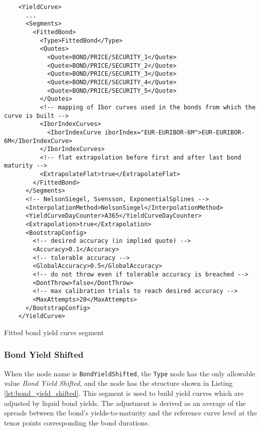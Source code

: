 \begin{listing}[H]
\begin{verbatim}
    <YieldCurve>
      ...
      <Segments>
        <FittedBond>
          <Type>FittedBond</Type>
          <Quotes>
            <Quote>BOND/PRICE/SECURITY_1</Quote>
            <Quote>BOND/PRICE/SECURITY_2</Quote>
            <Quote>BOND/PRICE/SECURITY_3</Quote>
            <Quote>BOND/PRICE/SECURITY_4</Quote>
            <Quote>BOND/PRICE/SECURITY_5</Quote>
          </Quotes>
          <!-- mapping of Ibor curves used in the bonds from which the curve is built -->
          <IborIndexCurves>
            <IborIndexCurve iborIndex="EUR-EURIBOR-6M">EUR-EURIBOR-6M</IborIndexCurve>
          </IborIndexCurves>
          <!-- flat extrapolation before first and after last bond maturity -->
          <ExtrapolateFlat>true</ExtrapolateFlat>
        </FittedBond>
      </Segments>
      <!-- NelsonSiegel, Svensson, ExponentialSplines -->
      <InterpolationMethod>NelsonSiegel</InterpolationMethod>
      <YieldCurveDayCounter>A365</YieldCurveDayCounter>
      <Extrapolation>true</Extrapolation>
      <BootstrapConfig>
        <!-- desired accuracy (in implied quote) -->
        <Accuracy>0.1</Accuracy>
        <!-- tolerable accuracy -->
        <GlobalAccuracy>0.5</GlobalAccuracy>
        <!-- do not throw even if tolerable accuracy is breached -->
        <DontThrow>false</DontThrow>
        <!-- max calibration trials to reach desired accuracy -->
        <MaxAttempts>20</MaxAttempts>
      </BootstrapConfig>
    </YieldCurve>
\end{verbatim}
\caption{Fitted bond yield curve segment}
\label{lst:fitted_bond_segment}
\end{listing}

\subsubsection*{Bond Yield Shifted}
\label{sec:bond_yield_shifted}

When the node name is \lstinline!BondYieldShifted!, the \lstinline!Type! node has the only allowable value \emph{Bond Yield Shifted},
and the node has the structure shown in Listing \ref{lst:bond_yield_shifted}. This segment is used to build yield
curves which are adjusted by liquid bond yields. The adjustment is derived as an average of the spreads between the bond's
yields-to-maturity and the reference curve level at the tenor points corresponding the bond durations.

